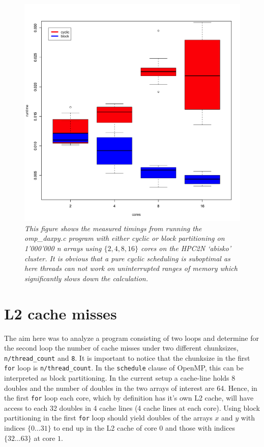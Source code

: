 \documentclass[a4paper,11pt,twoside]{article}
\begin{document}
\begin{figure}
  \centering
  \includegraphics[width=1\textwidth]{daxpy.png}
  \caption{\textit{This figure shows the measured timings from running the omp\_daxpy.c program with either cyclic or block partitioning on 1'000'000 n arrays using $\{2, 4, 8, 16\}$ cores on the HPC2N `abisko' cluster. It is obvious that a pure cyclic scheduling is suboptimal as here threads can not work on uninterrupted ranges of memory which significantly slows down the calculation.}}
  \label{fig:daxpy}
\end{figure}

\section{L2 cache misses}
The aim here was to analyze a program consisting of two loops and determine for the second loop the number of cache misses under two different chunksizes, \verb+n/thread_count+ and \verb+8+. It is important to notice that the chunksize in the first \verb+for+ loop is \verb+n/thread_count+. In the \verb+schedule+ clause of OpenMP, this can be interpreted as block partitioning. In the current setup a cache-line holds 8 doubles and the number of doubles in the two arrays of interest are 64. Hence, in the first \verb+for+ loop each core, which by definition has it's own L2 cache, will have access to each 32 doubles in 4 cache lines (4 cache lines at each core). Using block partitioning in the first \verb+for+ loop should yield doubles of the arrays $x$ and $y$ with indices $\{0...31\}$ to end up in the L2 cache of core $0$ and those with indices $\{32...63\}$ at core $1$.
\end{document}
